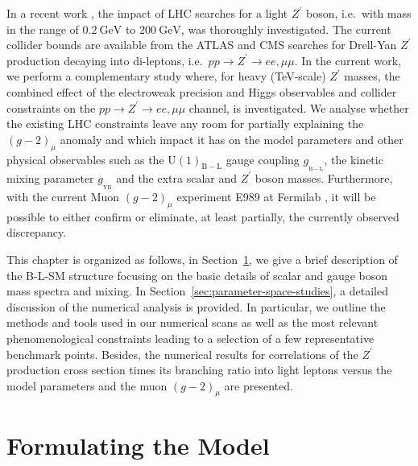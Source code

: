 \documentclass[10pt]{report}
\newcommand{\g}[2]{g_{_\mathrm{#1}}^{#2}}
\newcommand{\ro}[1]{\textrm{#1}}
\newcommand{\U}[1]{\mathrm{U}(1)_{\mathrm{#1}}}
\begin{document}
In a recent work \cite{Deppisch:2019ldi}, the impact of LHC searches for a light $Z^\prime$ boson, i.e.~with mass in the range of $0.2~\ro{GeV}$ to $200~\ro{GeV}$, was thoroughly investigated. 
%
The current collider bounds are available from the ATLAS  \cite{Aad:2019fac} and CMS \cite{Sirunyan:2018exx} searches for Drell-Yan $Z^\prime$ production decaying into di-leptons, 
i.e.~$pp \to Z^\prime \to ee,\mu \mu$. In the current work, we perform a complementary study where, for heavy (TeV-scale) $Z^\prime$ masses, the combined effect of the electroweak precision and Higgs observables and collider constraints on the $pp \to Z^\prime \to ee,\mu \mu$ channel, is investigated. We analyse whether the existing LHC constraints leave any room for partially explaining the $(g-2)_\mu$ anomaly and which impact it has on the model parameters and other physical observables such as the $\U{B-L}$ gauge coupling $\g{B-L}{}$, the kinetic mixing parameter $\g{YB}{}$ and the extra scalar and $Z^\prime$ boson masses. Furthermore, with the current Muon $(g-2)_\mu$ experiment E989 at Fermilab \cite{Grange:2015fou}, it will be possible to either confirm or eliminate, at least partially, the currently observed discrepancy.

This chapter is organized as follows, in Section~\ref{sec:BLSM}, we give a brief description of the B-L-SM structure focusing on the basic details of scalar and gauge boson mass spectra and mixing. In Section~\ref{sec:parameter-space-studies}, a detailed discussion of the numerical analysis is provided. In particular, we outline the methods and tools used in our numerical scans as well as the most relevant phenomenological constraints leading to a selection of a few representative benchmark points. Besides, the numerical results for correlations of the $Z^\prime$ production cross section times its branching ratio into light leptons versus the model parameters and the muon $(g-2)_\mu$ are presented. 

\section{Formulating the Model}
\label{sec:BLSM}
\end{document}

